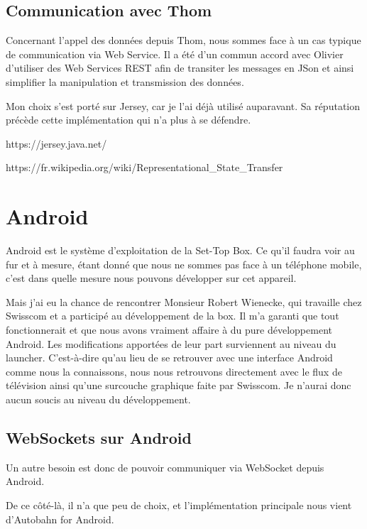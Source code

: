 \documentclass[a4paper, 12pt, svgnames]{report}
\begin{document}
\subsection{Communication avec Thom}
Concernant l'appel des données depuis Thom, nous sommes face à un cas typique de communication via Web Service. Il a été d'un commun accord avec Olivier d'utiliser des Web Services REST afin de transiter les messages en JSon et ainsi simplifier la manipulation et transmission des données.

\medskip

Mon choix s'est porté sur Jersey, car je l'ai déjà utilisé auparavant. Sa réputation précède cette implémentation qui n'a plus à se défendre.

\medskip

https://jersey.java.net/

https://fr.wikipedia.org/wiki/Representational\_State\_Transfer

\section{Android}
Android est le système d'exploitation de la Set-Top Box. Ce qu'il faudra voir au fur et à mesure, étant donné que nous ne sommes pas face à un téléphone mobile, c'est dans quelle mesure nous pouvons développer sur cet appareil.

\medskip

Mais j'ai eu la chance de rencontrer Monsieur Robert Wienecke, qui travaille chez Swisscom et a participé au développement de la box. Il m'a garanti que tout fonctionnerait et que nous avons vraiment affaire à du pure développement Android. Les modifications apportées de leur part surviennent au niveau du launcher. C'est-à-dire qu'au lieu de se retrouver avec une interface Android comme nous la connaissons, nous nous retrouvons directement avec le flux de télévision ainsi qu'une surcouche graphique faite par Swisscom. Je n'aurai donc aucun soucis au niveau du développement.

\subsection{WebSockets sur Android}
Un autre besoin est donc de pouvoir communiquer via WebSocket depuis Android.

\medskip

De ce côté-là, il n'a que peu de choix, et l'implémentation principale nous vient d'Autobahn for Android.
\end{document}
